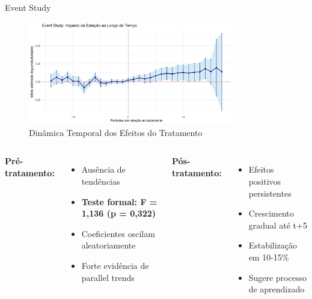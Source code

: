 \documentclass[10pt,aspectratio=169]{beamer}
\begin{document}
\begin{frame}{Event Study}
\begin{figure}
\centering
\includegraphics[width=0.8\textwidth]{../../../data/outputs/event_study.png}
\caption{Dinâmica Temporal dos Efeitos do Tratamento}
\end{figure}

\begin{columns}
\textbf{Pré-tratamento:}
\begin{itemize}
    \item Ausência de tendências
    \item \textbf{Teste formal: F = 1,136 (p = 0,322)}
    \item Coeficientes oscilam aleatoriamente
    \item Forte evidência de parallel trends
\end{itemize}

\textbf{Pós-tratamento:}
\begin{itemize}
    \item Efeitos positivos persistentes
    \item Crescimento gradual até t+5
    \item Estabilização em 10-15\%
    \item Sugere processo de aprendizado
\end{itemize}
\end{columns}
\end{frame}
\end{document}
